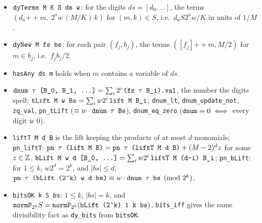 \begin{definition}
\begin{itemize}
\item $\textnormal{\texttt{dyTerms M K S ds w}}$: for the digits $ds = [d_0,\dots]$, the terms
  $(d_a\mathbin{+\!\!+}m,\ 2^a w\,(M/K)\,k)$ for $(m,k)\in S$, i.e.\ $d_a S 2^a w/K$ in units of $1/M$.
\item $\textnormal{\texttt{dyNew M fs bs}}$: for each pair $(f_j,b_j)$, the terms $([f_j]\mathbin{+\!\!+}m, M/2)$ for
  $m\in b_j$, i.e.\ $f_jb_j/2$.
\item \textnormal{\texttt{hasAny ds m}} holds when $m$ contains a variable of $ds$.
\item $\textnormal{\texttt{dnum \ensuremath{\tau} [B\_\allowbreak{}0,\allowbreak{} B\_\allowbreak{}1,\allowbreak{} .\allowbreak{}.\allowbreak{}.\allowbreak{}]}} = \sum_i 2^i\,\textnormal{\texttt{(\allowbreak{}fz \ensuremath{\tau} B\_\allowbreak{}i).\allowbreak{}val}}$, the number the digits
  spell; $\textnormal{\texttt{tLift M w Bs}} = \sum_i w2^i\,\textnormal{\texttt{lift M B\_\allowbreak{}i}}$; \textnormal{\texttt{dnum\_\allowbreak{}lt}},
  \textnormal{\texttt{dnum\_\allowbreak{}update\_\allowbreak{}not}}, \textnormal{\texttt{zq\_\allowbreak{}val}}, \textnormal{\texttt{pn\_\allowbreak{}tLift}} ($\equiv w\cdot\textnormal{\texttt{dnum \ensuremath{\tau} Bs}}$),
  \textnormal{\texttt{dnum\_\allowbreak{}eq\_\allowbreak{}zero}} ($\textnormal{\texttt{dnum}} = 0\iff$ every digit is $0$).
\item \textnormal{\texttt{liftT M d B}} is the lift keeping the products of at most $d$ monomials;
  \textnormal{\texttt{pn\_\allowbreak{}liftT}}: $\textnormal{\texttt{pn \ensuremath{\tau} (\allowbreak{}lift M B)}} = \textnormal{\texttt{pn \ensuremath{\tau} (\allowbreak{}liftT M d B)}} + (M-2)^d z$ for some $z\in\mathbb{Z}$.
  $\textnormal{\texttt{bLift M w d [B\_\allowbreak{}0,\allowbreak{} .\allowbreak{}.\allowbreak{}.\allowbreak{}]}} = \sum_i w2^i\,\textnormal{\texttt{liftT M (\allowbreak{}d-{}i) B\_\allowbreak{}i}}$; \textnormal{\texttt{pn\_\allowbreak{}bLift}}: for
  $1\le k$, $w2^d=2^k$, and $|bs|\le d$, $\textnormal{\texttt{pn \ensuremath{\tau} (\allowbreak{}bLift (\allowbreak{}2\^{}k) w d bs)}}\equiv w\cdot\textnormal{\texttt{dnum \ensuremath{\tau} bs}}\pmod{2^k}$.
\item \textnormal{\texttt{bitsOK k S bs}}: $1\le k$, $|bs|=k$, and
  $\textnormal{\texttt{normP}}_{2^k} S = \textnormal{\texttt{normP}}_{2^k}(\textnormal{\texttt{bLift (\allowbreak{}2\^{}k) 1 k bs}})$. \textnormal{\texttt{bits\_\allowbreak{}iff}} gives the
  same divisibility fact as \textnormal{\texttt{dy\_\allowbreak{}bits}} from \textnormal{\texttt{bitsOK}}.
\end{itemize}
\end{definition}

